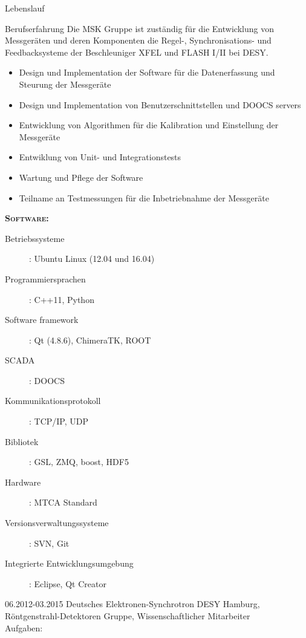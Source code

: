 \documentclass[11pt,a4paper]{scrartcl}
\begin{document}
\begin{cv}{Lebenslauf}
\begin{cvlist}{Berufserfahrung}
Die MSK Gruppe ist zust{\"a}ndig f{\"u}r die Entwicklung von Messger{\"a}ten und
deren Komponenten die Regel-, Synchronisations- und Feedbacksysteme der Beschleuniger XFEL
und FLASH I/II bei DESY.
\begin{itemize}
  \item Design und Implementation der Software f{\"u}r die Datenerfassung und
  Steurung der Messger{\"a}te
  \item Design und Implementation von Benutzerschnittstellen und DOOCS servers
  \item Entwicklung von Algorithmen f{\"u}r die Kalibration und
  Einstellung der Messger{\"a}te
  \item Entwiklung von Unit- und Integrationstests
  \item Wartung und Pflege der Software
  \item Teilname an Testmessungen f{\"u}r die Inbetriebnahme der Messger{\"a}te
\end{itemize}
{\scshape {\bfseries Software:}}
\begin{description}
\item[Betriebssysteme] : Ubuntu Linux (12.04 und 16.04)
\item[Programmiersprachen] : C++11, Python
\item[Software framework] : Qt (4.8.6), ChimeraTK, ROOT
\item[SCADA] : DOOCS
\item[Kommunikationsprotokoll] : TCP/IP, UDP
\item[Bibliotek] : GSL, ZMQ, boost, HDF5
\item[Hardware] : MTCA Standard
\item[Versionsverwaltungssysteme] : SVN, Git
\item[Integrierte Entwicklungsumgebung] : Eclipse, Qt Creator
\end{description}

\vspace{\baselineskip}

\item[06.2012-03.2015] Deutsches Elektronen-Synchrotron DESY Hamburg,
R{\"o}ntgenstrahl-Detektoren Gruppe, Wissenschaftlicher Mitarbeiter\\

Aufgaben:\\


\end{cvlist}
\end{cv}
\end{document}
